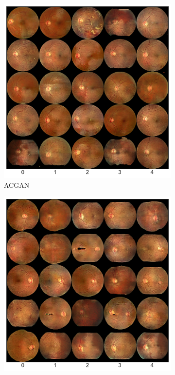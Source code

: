 \begin{figure}[h]
    \centering
    \begin{subfigure}{0.31\textwidth}
        \centering
        \includegraphics[width=\linewidth]{evaluation/figs/acgan_retina_sample.pdf}
        \caption{ACGAN}
        \label{fig:generated_retinas_acgan}
    \end{subfigure}
    \begin{subfigure}{0.31\textwidth}
        \centering
        \includegraphics[width=\linewidth]{evaluation/figs/progan_retina_sample.pdf}

\end{subfigure}
\end{figure}
